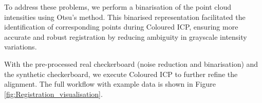 
To address these problems, we perform a binarisation of the point cloud intensities using Otsu’s method. This binarised representation facilitated the identification of corresponding points during Coloured ICP, ensuring more accurate and robust registration by reducing ambiguity in grayscale intensity variations.

With the pre-processed real checkerboard (noise reduction and binarisation) and the synthetic checkerboard, we execute Coloured ICP to further refine the alignment. The full workflow with example data is shown in Figure \ref{fig:Registration_visualisation}.


